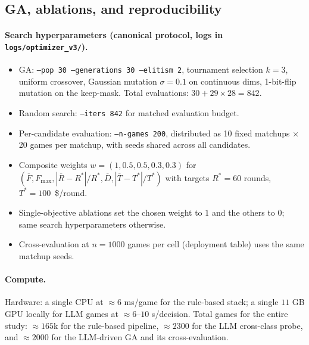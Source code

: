 \documentclass[10pt]{article}
\begin{document}
\subsection{GA, ablations, and reproducibility}\label{app:ga}

\paragraph{Search hyperparameters (canonical protocol, logs in
\texttt{logs/optimizer\_v3/}).}
\begin{itemize}[leftmargin=1.2em,itemsep=1pt]
\item GA: \texttt{--pop 30 --generations 30 --elitism 2}, tournament
selection $k{=}3$, uniform crossover, Gaussian mutation
$\sigma{=}0.1$ on continuous dims, 1-bit-flip mutation on the
keep-mask. Total evaluations: $30 + 29 \times 28 = 842$.
\item Random search: \texttt{--iters 842} for matched evaluation
budget.
\item Per-candidate evaluation: \texttt{--n-games 200}, distributed
as 10 fixed matchups $\times$ 20 games per matchup, with seeds
shared across all candidates.
\item Composite weights $w = (1, 0.5, 0.5, 0.3, 0.3)$ for
$(\overline{F}, F_{\max}, |\overline{R}-R^{*}|/R^{*},
\overline{D}, |\overline{T}-T^{*}|/T^{*})$ with targets
$R^{*} = 60$ rounds, $T^{*} = 100$~\$/round.
\item Single-objective ablations set the chosen weight to $1$ and
the others to $0$; same search hyperparameters otherwise.
\item Cross-evaluation at $n{=}1000$ games per cell (deployment
table) uses the same matchup seeds.
\end{itemize}

\paragraph{Compute.} Hardware: a single CPU at $\approx 6$ ms/game for
the rule-based stack; a single $11$ GB GPU locally for LLM games at
$\approx 6$--$10$ s/decision. Total games for the entire study:
$\approx 165$k for the rule-based pipeline, $\approx 2300$ for the LLM
cross-class probe, and $\approx 2000$ for the LLM-driven GA and its
cross-evaluation.
\end{document}
